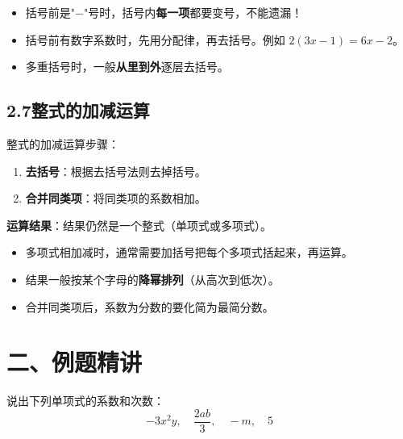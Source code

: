 \documentclass[12pt, a4paper]{ctexart}
\begin{document}
\begin{warnbox}[易错提醒]
\begin{itemize}[leftmargin=*]
  \item 括号前是"$-$"号时，括号内\textbf{每一项}都要变号，不能遗漏！
  \item 括号前有数字系数时，先用分配律，再去括号。例如 $2(3x - 1) = 6x - 2$。
  \item 多重括号时，一般\textbf{从里到外}逐层去括号。
\end{itemize}
\end{warnbox}

\subsection*{2.7\quad 整式的加减运算}

\begin{knowledgebox}[整式的加减运算法则]
整式的加减运算步骤：
\begin{enumerate}[leftmargin=*]
  \item \textbf{去括号}：根据去括号法则去掉括号。
  \item \textbf{合并同类项}：将同类项的系数相加。
\end{enumerate}

\textbf{运算结果}：结果仍然是一个整式（单项式或多项式）。
\end{knowledgebox}

\begin{tipbox}[整式加减的注意事项]
\begin{itemize}[leftmargin=*]
  \item 多项式相加减时，通常需要加括号把每个多项式括起来，再运算。
  \item 结果一般按某个字母的\textbf{降幂排列}（从高次到低次）。
  \item 合并同类项后，系数为分数的要化简为最简分数。
\end{itemize}
\end{tipbox}


\section*{\textcolor{examorange}{二、例题精讲}}

\begin{examplebox}[【例题1】识别单项式的系数与次数]
说出下列单项式的系数和次数：
\[
-3x^2y,\quad \frac{2ab}{3},\quad -m,\quad 5
\]
\end{examplebox}
\end{document}
